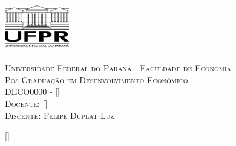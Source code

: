 \documentclass[a4paper, 11pt]{article}
\begin{document}
	
	
	\colorbox{white!10!}{
		\begin{minipage}[l]{0.169 \textwidth}
			\begin{flushleft}
				\includegraphics[width=1.1in,height=0.85in]{./Imagens/logo_UFPR.png}
			\end{flushleft}
		\end{minipage}
		\begin{minipage}[l]{0.75 \textwidth}
			\begin{flushleft}
				{\large \textsc{Universidade Federal do Paraná - Faculdade de Economia}}
				\\
				{\large \textsc{Pós Graduação em Desenvolvimento Econômico}}
				\\
				\large \textsc{DECO0000 - []}
				\\
				\large \textsc{Docente: []}
				\\
				\large \textsc{Discente: Felipe Duplat Luz}
			\end{flushleft}
		\end{minipage}
	}
	


\fancyhf{}
\pagestyle{fancy}
\renewcommand{\footrulewidth}{0.1mm}
\renewcommand{\headrulewidth}{0.0mm}
\fancyfoot[R]{\thepage}

\fancypagestyle{plain}{
	\fancyhf{}
	\renewcommand{\footrulewidth}{0.1mm}
	\fancyfoot[R]{\thepage}
	\renewcommand{\headrulewidth}{empty}}


[]


\nocite{sotomayor21, dolevchenko09}
\end{document}
